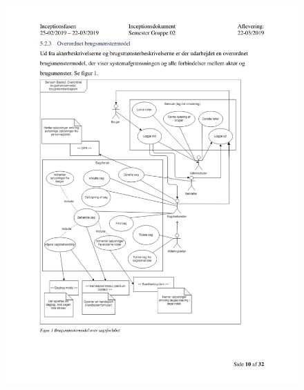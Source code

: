 \begin{figure}[hb]
  \includegraphics[scale = 0.33]{./PNG/Inceptions/Gruppe 02 + InceptionsDokument-11.jpg} 
\end{figure}

